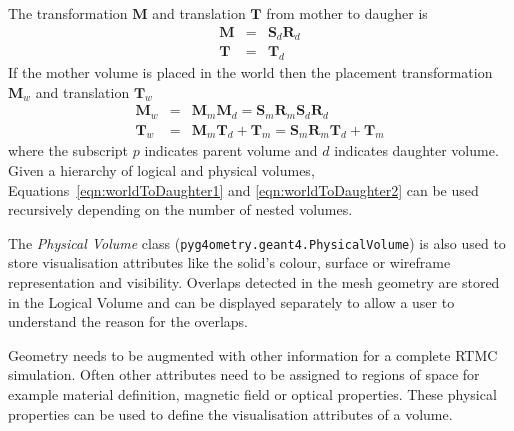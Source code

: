 \documentclass[final,5p,times,twocolumn]{elsarticle}
\newcommand{\pyinline}[1]{\lstinline[postbreak={}]{#1}}
\begin{document}
The transformation  $\mathbf{M}$  and translation $\mathbf{T}$ from mother to daugher is 
\begin{eqnarray}
\mathbf{M} 	& = &  \mathbf{S}_d  \mathbf{R}_d \\
\mathbf{T} 	& = &  \mathbf{T}_d
\end{eqnarray}
%
If the mother volume is placed in the world then the placement transformation $\mathbf{M}_w$ and translation $\mathbf{T}_w$ 
\begin{eqnarray}
\mathbf{M}_w	  	& = & \mathbf{M}_m \mathbf{M}_d  = \mathbf{S}_m \mathbf{R}_m  \mathbf{S}_d \mathbf{R}_d				\label{eqn:worldToDaughter1}\\
\mathbf{T}	_w 		& = & \mathbf{M}_m \mathbf{T}_d + \mathbf{T}_m= \mathbf{S}_m \mathbf{R}_m \mathbf{T}_d + \mathbf{T}_m  \label{eqn:worldToDaughter2}
\end{eqnarray}
where the subscript $p$ indicates parent volume and $d$ indicates daughter volume. Given a hierarchy of logical and physical volumes, 
Equations~\ref{eqn:worldToDaughter1} and \ref{eqn:worldToDaughter2} can be used recursively depending on the number of nested volumes.

The {\it Physical Volume} class (\pyinline{pyg4ometry.geant4.PhysicalVolume}) is also used to store visualisation attributes like the solid's 
colour, surface or wireframe representation and visibility. Overlaps detected in the mesh geometry are
stored in the Logical Volume and can be  displayed separately to allow a user to understand the reason for 
the overlaps.   

Geometry needs to be augmented with other information for a complete RTMC simulation. Often other attributes need to be 
assigned to regions of space for example material definition, magnetic field or optical properties. These physical properties 
can be used to define the visualisation attributes of a volume. 
\end{document}
